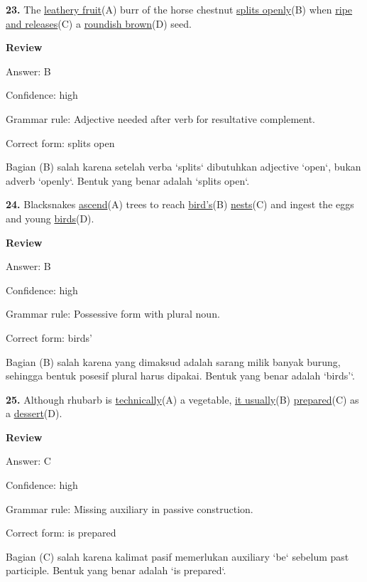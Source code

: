 \documentclass[12pt]{article}
\begin{document}
\endgroup
\par
\vspace{\questionblockgap}
\noindent\textbf{23.} The \uline{leathery fruit}(A) burr of the horse chestnut \uline{splits openly}(B) when \uline{ripe and releases}(C) a \uline{roundish brown}(D) seed.
\par
\begingroup
\setlength{\parskip}{0pt}
\setlength{\parindent}{0pt}
\textbf{Review}\par
Answer: B\par
Confidence: high\par
Grammar rule: Adjective needed after verb for resultative complement.\par
Correct form: splits open\par
Bagian (B) salah karena setelah verba `splits` dibutuhkan adjective `open`, bukan adverb `openly`. Bentuk yang benar adalah `splits open`.\par
\endgroup
\par
\vspace{\questionblockgap}
\noindent\textbf{24.} Blacksnakes \uline{ascend}(A) trees to reach \uline{bird's}(B) \uline{nests}(C) and ingest the eggs and young \uline{birds}(D).
\par
\begingroup
\setlength{\parskip}{0pt}
\setlength{\parindent}{0pt}
\textbf{Review}\par
Answer: B\par
Confidence: high\par
Grammar rule: Possessive form with plural noun.\par
Correct form: birds'\par
Bagian (B) salah karena yang dimaksud adalah sarang milik banyak burung, sehingga bentuk posesif plural harus dipakai. Bentuk yang benar adalah `birds'`.\par
\endgroup
\par
\vspace{\questionblockgap}
\noindent\textbf{25.} Although rhubarb is \uline{technically}(A) a vegetable, \uline{it usually}(B) \uline{prepared}(C) as a \uline{dessert}(D).
\par
\begingroup
\setlength{\parskip}{0pt}
\setlength{\parindent}{0pt}
\textbf{Review}\par
Answer: C\par
Confidence: high\par
Grammar rule: Missing auxiliary in passive construction.\par
Correct form: is prepared\par
Bagian (C) salah karena kalimat pasif memerlukan auxiliary `be` sebelum past participle. Bentuk yang benar adalah `is prepared`.\par
\end{document}
